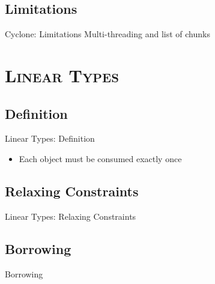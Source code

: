 \documentclass[xcolor=x11names,compress]{beamer}
\renewcommand{\(}{\begin{columns}}
\renewcommand{\)}{\end{columns}}
\newcommand{\<}[1]{\begin{column}{#1}}
\renewcommand{\>}{\end{column}}
\begin{document}
\subsection{Limitations}
\begin{frame}{Cyclone: Limitations}
    Multi-threading and list of chunks
\end{frame}

\section{\scshape Linear Types}
\subsection{Definition}
\begin{frame}{Linear Types: Definition}
    \begin{itemize}
        \item Each object must be consumed exactly once
    \end{itemize}
\end{frame}

\subsection{Relaxing Constraints}
\begin{frame}{Linear Types: Relaxing Constraints}
    
\end{frame}

\subsection{Borrowing}
\begin{frame}{Borrowing}
    
\end{frame}
\end{document}
